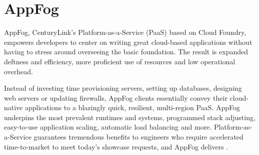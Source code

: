 \section{AppFog}
AppFog, CenturyLink's Platform-as-a-Service (PaaS) based on Cloud Foundry, 
empowers developers to center on writing great cloud-based applications 
without having to stress around overseeing the basic foundation. 
The result is expanded deftness and efficiency, more proficient use 
of resources and low operational overhead.

Instead of investing time provisioning servers, setting up databases, 
designing web servers or updating firewalls, AppFog clients essentially 
convey their cloud-native applications to a blazingly quick, resilient, 
multi-region PaaS. AppFog underpins the most prevalent runtimes and systems, 
programmed stack adjusting, easy-to-use application scaling, automatic 
load balancing and more. Platform-as-a-Service guarantees tremendous 
benefits to engineers who require accelerated time-to-market to meet 
today’s showcase requests, and AppFog 
delivers \cite{hid-sp18-412-century_link_appfog}.
